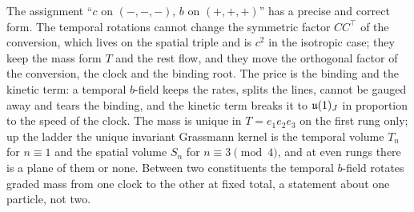 The assignment ``$c$ on $(-,-,-)$, $b$ on $(+,+,+)$'' has a precise and correct form. The temporal rotations cannot change the symmetric factor
$CC^{\!\top}$ of the conversion, which lives on the spatial triple and is $c^2$ in the isotropic case; they keep the mass form $T$ and the rest
flow, and they move the orthogonal factor of the conversion, the clock and the binding root. The price is the binding and the kinetic term: a
temporal $b$-field keeps the rates, splits the lines, cannot be gauged away and tears the binding, and the kinetic term breaks it to $\mathfrak{u}(1)_J$ in
proportion to the speed of the clock. The mass is unique in $T=e_1e_2e_3$ on the first rung only; up the ladder the unique invariant Grassmann kernel is the temporal volume
$T_n$ for $n\equiv1$ and the spatial volume $S_n$ for $n\equiv3\pmod4$, and at even rungs there is a plane of them or none. Between two constituents the temporal $b$-field rotates
graded mass from one clock to the other at fixed total, a statement about one particle, not two.

